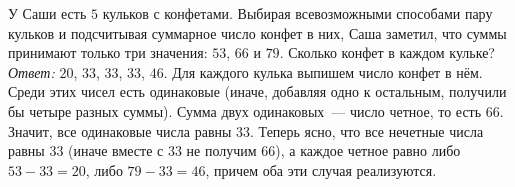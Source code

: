 \problem{}
У Саши есть $5$ кульков с конфетами.
Выбирая всевозможными способами пару кульков и подсчитывая суммарное число
конфет в них, Саша заметил, что суммы принимают только три значения:
$53$, $66$ и $79$.
Сколько конфет в каждом кульке?
\solution
\emph{Ответ:} $20$, $33$, $33$, $33$, $46$.
Для каждого кулька выпишем число конфет в нём.
Среди этих чисел есть одинаковые
(иначе, добавляя одно к остальным, получили бы четыре разных суммы).
Сумма двух одинаковых~--- число четное, то есть $66$.
Значит, все одинаковые числа равны $33$.
Теперь ясно, что все нечетные числа равны $33$
(иначе вместе с $33$ не получим $66$), а каждое четное равно
либо $53 - 33 = 20$, либо $79 - 33 = 46$, причем оба эти случая реализуются.
\endproblem
